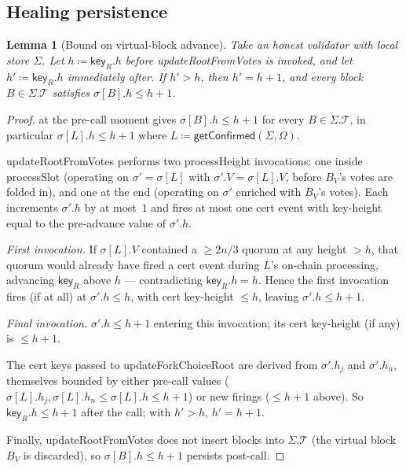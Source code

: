 \ifx\litemode\undefined\documentclass{article}\fi
\newcommand{\T}[0]{\ensuremath{\mathcal{T}}}
\newcommand{\key}{\mathsf{key}}
\newcommand{\processSlot}{\textsf{processSlot}\xspace}
\newcommand{\processHeight}{\textsf{processHeight}\xspace}
\newcommand{\updateForkChoiceRoot}{\textsf{updateForkChoiceRoot}\xspace}
\newcommand{\updateRootFromVotes}{\textsf{updateRootFromVotes}\xspace}
\newcommand{\getConfirmed}{\textsf{getConfirmed}\xspace}
\theoremstyle{plain}
\newtheorem{lemma}{Lemma}
\theoremstyle{definition}
\theoremstyle{remark}
\begin{document}
\subsection{Healing persistence}\label{rev:sec:healing-persistence}


\begin{lemma}[Bound on virtual-block advance]\label{rev:lem:virtual-block-advance}
Take an honest validator with local store $\Sigma$. Let $h \coloneqq \key_R.h$ before \updateRootFromVotes is invoked, and let $h' \coloneqq \key_R.h$ immediately after. If $h' > h$, then $h' = h+1$, and every block $B \in \Sigma.\T$ satisfies $\sigma[B].h \leq h+1$.
\end{lemma}

\begin{proof}
 at the pre-call moment gives $\sigma[B].h \leq h+1$ for every $B \in \Sigma.\T$, in particular $\sigma[L].h \leq h+1$ where $L \coloneqq \getConfirmed(\Sigma, \Omega)$.

\updateRootFromVotes performs two \processHeight{} invocations: one inside \processSlot{} (operating on $\sigma' = \sigma[L]$ with $\sigma'.V = \sigma[L].V$, before $B_V$'s votes are folded in), and one at the end (operating on $\sigma'$ enriched with $B_V$'s votes). Each increments $\sigma'.h$ by at most~$1$ and fires at most one cert event with key-height equal to the pre-advance value of $\sigma'.h$.

\emph{First invocation.}
If $\sigma[L].V$ contained a $\geq 2n/3$ quorum at any height $>h$, that quorum would already have fired a cert event during $L$'s on-chain processing, advancing $\key_R$ above $h$ — contradicting $\key_R.h = h$. Hence the first invocation fires (if at all) at $\sigma'.h \leq h$, with cert key-height $\leq h$, leaving $\sigma'.h \leq h+1$.

\emph{Final invocation.}
$\sigma'.h \leq h+1$ entering this invocation; its cert key-height (if any) is $\leq h+1$.

The cert keys passed to \updateForkChoiceRoot{} are derived from $\sigma'.h_j$ and $\sigma'.h_n$, themselves bounded by either pre-call values ($\sigma[L].h_j, \sigma[L].h_n \leq \sigma[L].h \leq h+1$) or new firings ($\leq h+1$ above). So $\key_R.h \leq h+1$ after the call; with $h' > h$, $h' = h+1$.

Finally, \updateRootFromVotes does not insert blocks into $\Sigma.\T$ (the virtual block $B_V$ is discarded), so $\sigma[B].h \leq h+1$ persists post-call.
\end{proof}
\end{document}
